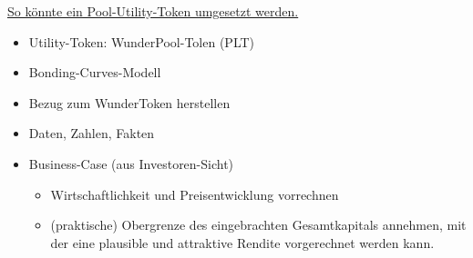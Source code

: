 
\vspace{0.3cm}

\href{https://medium.com/atchai/can-we-save-the-utility-token-55ef639370cf}{So könnte ein Pool-Utility-Token umgesetzt werden.}

\vspace{0.3cm}

\begin{itemize}
	\item Utility-Token: WunderPool-Tolen (PLT)
	\item Bonding-Curves-Modell
	\item Bezug zum WunderToken herstellen
	\item Daten, Zahlen, Fakten 
	\item Business-Case (aus Investoren-Sicht)
	\begin{itemize}
		\item Wirtschaftlichkeit und Preisentwicklung vorrechnen
		\item (praktische) Obergrenze des eingebrachten Gesamtkapitals annehmen, mit der eine plausible und attraktive Rendite vorgerechnet werden kann.
	\end{itemize}
\end{itemize}

\newpage


\vspace{0.5cm}

